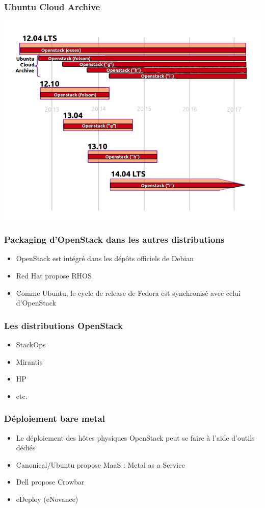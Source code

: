   \begin{frame}
    \frametitle{Ubuntu Cloud Archive}
    \includegraphics{images/ubuntu-cloud-archive.png}
  \end{frame}

  \begin{frame}
    \frametitle{Packaging d'OpenStack dans les autres distributions}
    \begin{itemize}
      \item OpenStack est intégré dans les dépôts officiels de Debian
      \item Red Hat propose RHOS
      \item Comme Ubuntu, le cycle de release de Fedora est synchronisé avec celui d'OpenStack
    \end{itemize}
  \end{frame}

  \begin{frame}
    \frametitle{Les distributions OpenStack}
    \begin{itemize}
      \item StackOps
      \item Mirantis
      \item HP
      \item etc.
    \end{itemize}
  \end{frame}

  \begin{frame}
    \frametitle{Déploiement bare metal}
    \begin{itemize}
      \item Le déploiement des hôtes physiques OpenStack peut se faire à l'aide d'outils dédiés\pause
      \item Canonical/Ubuntu propose MaaS : Metal as a Service
      \item Dell propose Crowbar
      \item eDeploy (eNovance)
    \end{itemize}
  \end{frame}

